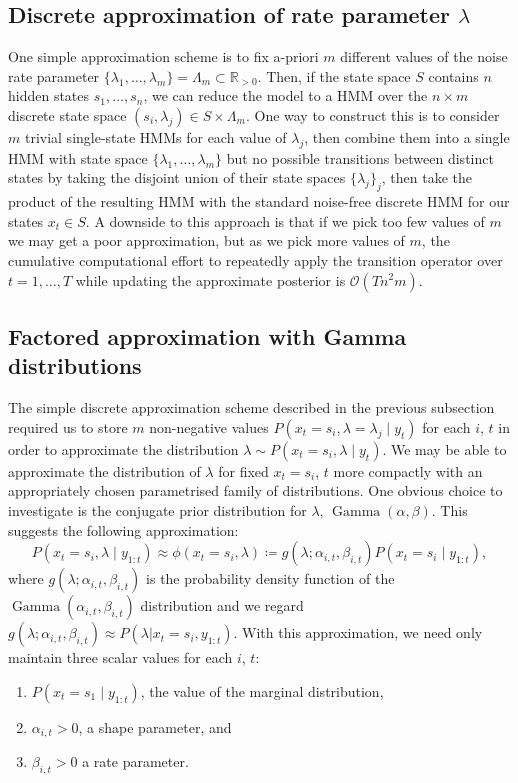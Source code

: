 \documentclass[twoside, 11pt]{article}
\DeclareMathOperator*{\gammad}{Gamma}
\newcommand{\reals}[0] {\mathbb{R}}
\newcommand{\bigO}[0] {\mathcal{O}}
\begin{document}
\subsection{Discrete approximation of rate parameter $\lambda$}

One simple approximation scheme is to fix a-priori $m$ different values of the noise rate parameter $\{ \lambda_1, \ldots, \lambda_m \} = \Lambda_m \subset \reals_{>0}$. Then, if the state space $S$ contains $n$ hidden states $s_1, \ldots, s_n$, we can reduce the model to a HMM over the $n \times m$ discrete state space $(s_i , \lambda_j ) \in S \times \Lambda_m$. One way to construct this is to consider $m$ trivial single-state HMMs for each value of $\lambda_j$, then combine them into a single HMM with state space $\{ \lambda_1, \ldots, \lambda_m \}$ but no possible transitions between distinct states by taking the disjoint union of their state spaces $\{ \lambda_j \}_j$, then take the product of the resulting HMM with the standard noise-free discrete HMM for our states $x_t \in S$.  A downside to this approach is that if we pick too few values of $m$ we may get a poor approximation, but as we pick more values of $m$, the cumulative computational effort to repeatedly apply the transition operator over $t = 1, \ldots, T$ while updating the approximate posterior is $ \bigO (T n^2 m ) $.

\subsection{Factored approximation with Gamma distributions}

The simple discrete approximation scheme described in the previous subsection required us to store $m$ non-negative values $P(x_t=s_i, \lambda=\lambda_j \mid y_t)$ for each $i$, $t$ in order to approximate the distribution $\lambda \sim P(x_t=s_i, \lambda \mid y_t)$. We may be able to approximate the distribution of $\lambda$ for fixed $x_t=s_i$, $t$ more compactly with an appropriately chosen parametrised family of distributions. One obvious choice to investigate is the conjugate prior distribution for $\lambda$, $\gammad(\alpha, \beta)$. This suggests the following approximation:
\begin{equation}
P\left(x_t=s_i, \lambda \mid y_{1:t} \right) \approx \phi(x_t=s_i, \lambda) \coloneqq g(\lambda ; \alpha_{i,t}, \beta_{i,t}) P(x_t=s_i \mid y_{1:t} ) ,
\end{equation}
where $g(\lambda ; \alpha_{i,t}, \beta_{i,t})$ is the probability density function of the $\gammad(\alpha_{i, t}, \beta_{i, t})$ distribution and we regard $g(\lambda ; \alpha_{i,t}, \beta_{i,t}) \approx P(\lambda | x_t=s_i, y_{1:t})$. With this approximation, we need only maintain three scalar values for each $i$, $t$:
\begin{enumerate}
\item $P(x_t=s_1 \mid y_{1:t})$, the value of the marginal distribution,
\item $\alpha_{i,t}>0$, a shape parameter, and
\item $\beta_{i,t}>0$ a rate parameter.
\end{enumerate}
\end{document}
